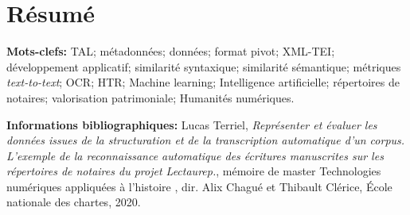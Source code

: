 \chapter*{Résumé}


\bigskip

\textbf{Mots-clefs:} TAL; métadonnées; données; format pivot; XML-TEI; développement applicatif; similarité syntaxique; similarité sémantique; métriques \textit{text-to-text}; OCR; HTR; Machine learning; Intelligence artificielle; répertoires de notaires; valorisation patrimoniale; Humanités numériques.

\bigskip
\bigskip
\bigskip

\textbf{Informations bibliographiques:} Lucas Terriel, \textit{Représenter et évaluer les données issues de la structuration et de la transcription automatique d'un corpus. L'exemple de la reconnaissance automatique des écritures manuscrites sur les répertoires de notaires du projet Lectaurep.}, mémoire de master \og Technologies numériques appliquées à l'histoire \fg{}, dir. Alix Chagué et Thibault Clérice, École nationale des chartes, 2020.

\clearpage
\thispagestyle{empty}
\cleardoublepage